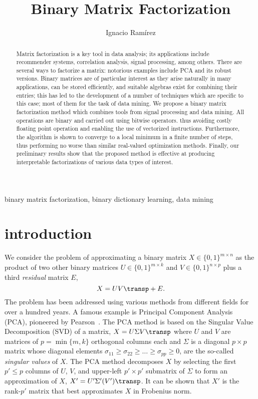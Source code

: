 \documentclass[a4paper]{IEEEtran}
\title{Binary Matrix Factorization}\author{Ignacio Ram\'{i}rez}
\begin{document}
%
\maketitle
%
\begin{abstract}
Matrix factorization is a key tool in data analysis; its applications include recommender systems, correlation analysis, signal processing, among others. There are several ways to factorize a matrix: notorious examples include PCA and its robust versions. Binary matrices are of particular interest as they arise naturally in many applications, can be stored   efficiently, and suitable algebras exist for combining their entries; this has led to the development  of a number of techniques which are specific to this case; most of them for the task of data mining.
We propose a binary matrix factorization method which combines tools from signal processing  and data mining. All operations are binary and carried out using bitwise operators. thus avoiding costly floating point operation and enabling the use of vectorized instructions. Furthermore, the algorithm is shown to converge to a local minimum in a finite number of steps,  thus performing no worse than similar real-valued optimization methods. Finally, our preliminary results show that the proposed method is effective at producing interpretable factorizations of various data types of interest.
\end{abstract}%
\begin{IEEEkeywords}
binary matrix factorization, binary dictionary learning, data mining
\end{IEEEkeywords}
%
\section{introduction}

We consider the problem of approximating a binary matrix $X \in \{0,1\}^{m{\times}n}$ as the product of two other binary matrices $U \in \{0,1\}^{m{\times}k}$ and $V \in \{0,1\}^{n{\times}p}$ plus a third \emph{residual} matrix $E$,
\begin{equation}
X = UV\transp + E.
\label{eq:mf}
\end{equation}
The problem  has been addressed using various methods from different fields for over a hundred years. A famous example is Principal Component Analysis (PCA), pioneered by Pearson~\cite{pearson01}. The PCA method is based on the Singular Value Decomposition (SVD) of a matrix, $X=U{\Sigma}V\transp$ where $U$ and $V$ are matrices of $p=\min\{m,k\}$  orthogonal columns each and $\Sigma$ is a diagonal $p{\times}p$ matrix whose diagonal elements $\sigma_{11} \geq \sigma_{22} \geq \ldots \geq \sigma_{pp} \geq 0$, are the so-called \emph{singular values} of $X$. The PCA method decomposes $X$ by selecting the first $p' \leq p$ columns of $U$, $V$, and upper-left $p'{\times}p'$ submatrix of $\Sigma$ to form an approximation of $X$, $X'=U'\Sigma'(V')\transp$. It can be shown that $X'$ is the rank-$p'$ matrix that best approximates $X$ in Frobenius norm.
\end{document}
